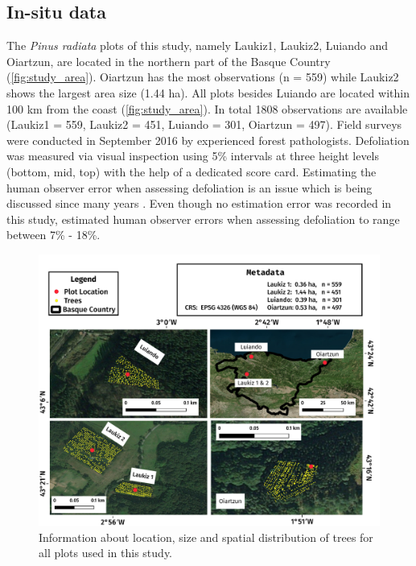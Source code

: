 \documentclass[peerreview]{IEEEtran}
\begin{document}
\subsection{In-situ data}

The \textit{Pinus radiata} plots of this study, namely Laukiz1, Laukiz2, Luiando and Oiartzun, are located in the northern part of the Basque Country (\autoref{fig:study_area}).
Oiartzun has the most observations (n = 559) while Laukiz2 shows the largest area size (1.44 ha).
All plots besides Luiando are located within 100 km from the coast (\autoref{fig:study_area}).
In total 1808 observations are available (Laukiz1 = 559, Laukiz2 = 451, Luiando = 301, Oiartzun = 497).
Field surveys were conducted in September 2016 by experienced forest pathologists.
Defoliation was measured via visual inspection using 5\% intervals at three height levels (bottom, mid, top) with the help of a dedicated score card.
Estimating the human observer error when assessing defoliation is an issue which is being discussed since many years \cite{innes1993}.
Even though no estimation error was recorded in this study, \cite{maclean1982} estimated human observer errors when assessing defoliation to range between 7\% - 18\%.

\begin{figure} [ht!]
	\begin{center}
		\centering
		\includegraphics[width=\textwidth] {study-area-hyperspectral.pdf}
		\caption{Information about location, size and spatial distribution of trees for all plots used in this study.}\label{fig:study_area}
	\end{center}
\end{figure}
\end{document}
